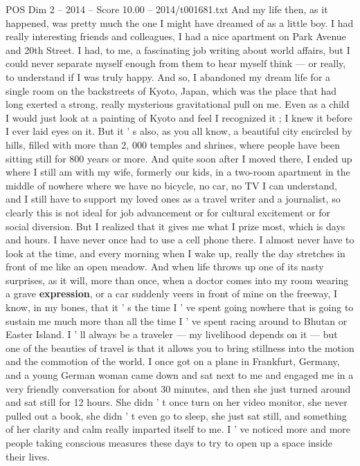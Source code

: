 \begin{textsample}{POS Dim 2 – 2014 – Score 10.00 – 2014/t001681.txt}
And my life then, as it happened, was pretty much the one I might have dreamed of as a little boy.
I had really interesting friends and colleagues, I had a nice apartment on Park Avenue and 20th Street.
I had, to me, a fascinating job writing about world affairs, but I could never separate myself enough from them to hear myself think — or really, to understand if I was truly happy.
And so, I abandoned my dream life for a single room on the backstreets of Kyoto, Japan, which was the place that had long exerted a strong, really mysterious gravitational pull on me.
Even as a child I would just look at a painting of Kyoto and feel I recognized it ; I knew it before I ever laid eyes on it.
But it ' s also, as you all know, a beautiful city encircled by hills, filled with more than 2, 000 temples and shrines, where people have been sitting still for 800 years or more.
And quite soon after I moved there, I ended up where I still am with my wife, formerly our kids, in a two-room apartment in the middle of nowhere where we have no bicycle, no car, no TV I can understand, and I still have to support my loved ones as a travel writer and a journalist, so clearly this is not ideal for job advancement or for cultural excitement or for social diversion.
But I realized that it gives me what I prize most, which is days and hours.
I have never once had to use a cell phone there.
I almost never have to look at the time, and every morning when I wake up, really the day stretches in front of me like an open meadow.
And when life throws up one of its nasty surprises, as it will, more than once, when a doctor comes into my room wearing a grave \textbf{expression}, or a car suddenly veers in front of mine on the freeway, I know, in my bones, that it ' s the time I ' ve spent going nowhere that is going to sustain me much more than all the time I ' ve spent racing around to Bhutan or Easter Island.
I ' ll always be a traveler — my livelihood depends on it — but one of the beauties of travel is that it allows you to bring stillness into the motion and the commotion of the world.
I once got on a plane in Frankfurt, Germany, and a young German woman came down and sat next to me and engaged me in a very friendly conversation for about 30 minutes, and then she just turned around and sat still for 12 hours.
She didn ' t once turn on her video monitor, she never pulled out a book, she didn ' t even go to sleep, she just sat still, and something of her clarity and calm really imparted itself to me.
I ' ve noticed more and more people taking conscious measures these days to try to open up a space inside their lives.

\end{textsample}
